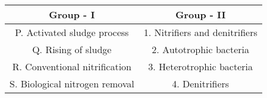\begin{tabular}[12pt]{ |c| c|}
    \hline
    \textbf{Group - I} & \textbf{Group - II} \\ 
    \hline
    P. Activated sludge process & 1. Nitrifiers and denitrifiers  \\
    \hline 
    Q. Rising of sludge & 2. Autotrophic bacteria \\
    \hline
    R. Conventional nitrification & 3. Heterotrophic bacteria \\
    \hline
    S. Biological nitrogen removal & 4. Denitrifiers \\
    \hline
    \end{tabular}

